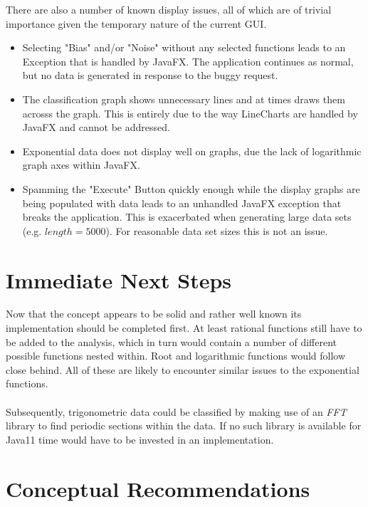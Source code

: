 \documentclass[main.tex]{subfiles}
\begin{document}
    
    
    There are also a number of known display issues, all of which are of trivial importance given the temporary nature of the current GUI.
    \begin{itemize}
      \item Selecting "Bias" and/or "Noise" without any selected functions leads to an Exception that is handled by JavaFX. The application continues as normal, but no data is generated in response to the buggy request.
      \item The classification graph shows unnecessary lines and at times draws them acrosss the graph. This is entirely due to the way LineCharts are handled by JavaFX and cannot be addressed.
      \item Exponential data does not display well on graphs, due the lack of logarithmic graph axes within JavaFX.
      \item Spamming the "Execute" Button quickly enough while the display graphs are being populated with data leads to an unhandled JavaFX exception that breaks the application. This is exacerbated when generating large data sets (e.g. $length=5000$). For reasonable data set sizes this is not an issue.
    \end{itemize}
    
  \section{Immediate Next Steps}
    
    Now that the concept appears to be solid and rather well known its implementation should be completed first. At least rational functions still have to be added to the analysis, which in turn would contain a number of different possible functions nested within. Root and logarithmic functions would follow close behind. All of these are likely to encounter similar issues to the exponential functions.
    \\\\
    Subsequently, trigonometric data could be classified by making use of an \textit{FFT} library to find periodic sections within the data. If no such library is available for Java11 time would have to be invested in an implementation.
        
  \section{Conceptual Recommendations}
    
\end{document}
